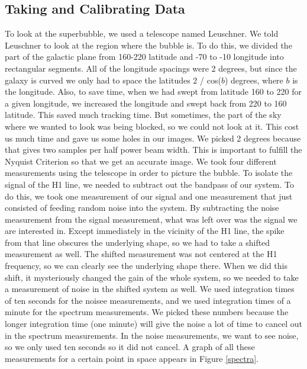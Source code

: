 \documentclass[11pt]{article}
\begin{document}
\subsection{Taking and Calibrating Data}
To look at the superbubble, we used a telescope named Leuschner. We told Leuschner to look at the region where the bubble is. To do this, we divided the part of the galactic plane from 160-220 latitude and -70 to -10 longitude into rectangular segments. All of the longitude spacings were 2 degrees, but since the galaxy is curved we only had to space the latitudes 2 / cos($b$) degrees, where $b$ is the longitude. Also, to save time, when we had swept from latitude 160 to 220 for a given longitude, we increased the longitude and swept back from 220 to 160 latitude. This saved much tracking time. But sometimes, the part of the sky where we wanted to look was being blocked, so we could not look at it. This cost us much time and gave us some holes in our images. We picked 2 degrees because that gives two samples per half power beam width. This is important to fulfill the Nyquist Criterion so that we get an accurate image. 
We took four different measurements using the telescope in order to picture the bubble. To isolate the signal of the H1 line, we needed to subtract out the bandpass of our system. To do this, we took one measurement of our signal and one measurement that just consisted of feeding random noise into the system. By subtracting the noise measurement from the signal measurement, what was left over was the signal we are interested in. Except immediately in the vicinity of the H1 line, the spike from that line obscures the underlying shape, so we had to take a shifted measurement as well. The shifted measurement was not centered at the H1 frequency, so we can clearly see the underlying shape there. When we did this shift, it mysteriously changed the gain of the whole system, so we needed to take a measurement of noise in the shifted system as well. We used integration times of ten seconds for the noisee measurements, and we used integration times of a minute for the spectrum measurements. We picked these numbers because the longer integration time (one minute) will give the noise a lot of time to cancel out in the spectrum measurements. In the noise measurements, we want to see noise, so we only used ten seconds so it did not cancel. A graph of all these measurements for a certain point in space appears in Figure \ref{spectra}.
\end{document}

